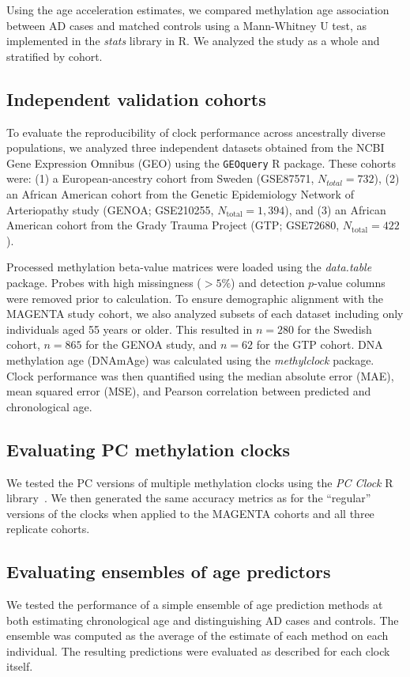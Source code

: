 Using the age acceleration estimates, we compared methylation age association between AD cases and matched controls using a Mann-Whitney U test, as implemented in the \textit{stats} library in R. We analyzed the study as a whole and stratified by cohort.

\subsection{Independent validation cohorts}
To evaluate the reproducibility of clock performance across ancestrally diverse 
populations, we analyzed three independent datasets obtained from the NCBI Gene 
Expression Omnibus (GEO) using the \texttt{GEOquery} R package. These cohorts 
were: (1) a European-ancestry cohort from Sweden (GSE87571, 
$N_{\mathrm{}{total}}=732$), (2) an African American cohort from the Genetic 
Epidemiology Network of Arteriopathy study (GENOA; GSE210255, 
$N_{\mathrm{total}}=1,394$), and (3) an African American cohort from the Grady Trauma 
Project (GTP; GSE72680, $N_{\mathrm{total}}=422$). 

Processed methylation beta-value matrices were loaded using the \textit{data.table} package. Probes with high missingness ($>5\%$) and detection $p$-value columns were removed prior to calculation. To ensure demographic alignment with the MAGENTA study cohort, we also analyzed subsets of each dataset including only individuals aged 55 years or older. This resulted in $n=280$ for the Swedish cohort, $n=865$ for the GENOA study, and $n=62$ for the GTP cohort. DNA methylation age (DNAmAge) was calculated using the \textit{methylclock} package. Clock performance was then quantified using the median absolute error (MAE), mean squared error (MSE), and Pearson correlation between predicted and chronological age.


\subsection{Evaluating PC methylation clocks}
We tested the PC versions of multiple methylation clocks using the \textit{PC Clock} R library~\citep{pcclocks_repo, higgins-chen_computational_2022}. We then generated the same accuracy metrics as for the ``regular'' versions of the clocks when applied to the MAGENTA cohorts and all three replicate cohorts.

\subsection{Evaluating ensembles of age predictors}
We tested the performance of a simple ensemble of age prediction methods at both estimating chronological age and distinguishing AD cases and controls. The ensemble was computed as the average of the estimate of each method on each individual. The resulting predictions were evaluated as described for each clock itself.

